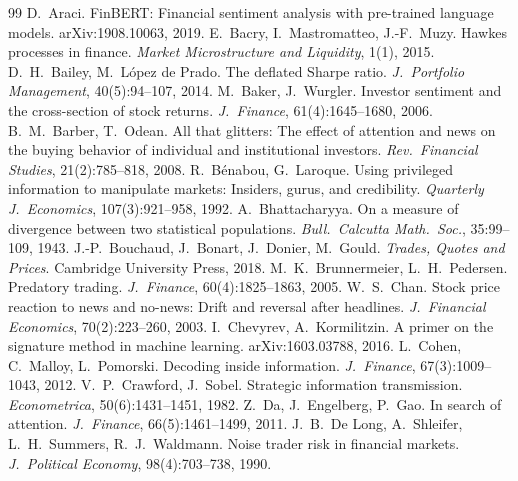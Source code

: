\documentclass[10pt,twocolumn,letterpaper]{article}
\theoremstyle{plain}
\theoremstyle{definition}
\theoremstyle{remark}
\begin{document}
{\small
\begin{thebibliography}{99}\setlength{\itemsep}{0pt}\footnotesize
{} D.~Araci. FinBERT: Financial sentiment analysis with pre-trained language models. arXiv:1908.10063, 2019.
 E.~Bacry, I.~Mastromatteo, J.-F.~Muzy. Hawkes processes in finance. \emph{Market Microstructure and Liquidity}, 1(1), 2015.
 D.~H.~Bailey, M.~L\'opez de Prado. The deflated Sharpe ratio. \emph{J.\ Portfolio Management}, 40(5):94--107, 2014.
 M.~Baker, J.~Wurgler. Investor sentiment and the cross-section of stock returns. \emph{J.\ Finance}, 61(4):1645--1680, 2006.
 B.~M.~Barber, T.~Odean. All that glitters: The effect of attention and news on the buying behavior of individual and institutional investors. \emph{Rev.\ Financial Studies}, 21(2):785--818, 2008.
 R.~B\'enabou, G.~Laroque. Using privileged information to manipulate markets: Insiders, gurus, and credibility. \emph{Quarterly J.\ Economics}, 107(3):921--958, 1992.
 A.~Bhattacharyya. On a measure of divergence between two statistical populations. \emph{Bull.\ Calcutta Math.\ Soc.}, 35:99--109, 1943.
 J.-P.~Bouchaud, J.~Bonart, J.~Donier, M.~Gould. \emph{Trades, Quotes and Prices}. Cambridge University Press, 2018.
 M.~K.~Brunnermeier, L.~H.~Pedersen. Predatory trading. \emph{J.\ Finance}, 60(4):1825--1863, 2005.
 W.~S.~Chan. Stock price reaction to news and no-news: Drift and reversal after headlines. \emph{J.\ Financial Economics}, 70(2):223--260, 2003.
 I.~Chevyrev, A.~Kormilitzin. A primer on the signature method in machine learning. arXiv:1603.03788, 2016.
 L.~Cohen, C.~Malloy, L.~Pomorski. Decoding inside information. \emph{J.\ Finance}, 67(3):1009--1043, 2012.
 V.~P.~Crawford, J.~Sobel. Strategic information transmission. \emph{Econometrica}, 50(6):1431--1451, 1982.
 Z.~Da, J.~Engelberg, P.~Gao. In search of attention. \emph{J.\ Finance}, 66(5):1461--1499, 2011.
 J.~B.~De Long, A.~Shleifer, L.~H.~Summers, R.~J.~Waldmann. Noise trader risk in financial markets. \emph{J.\ Political Economy}, 98(4):703--738, 1990.

\end{thebibliography}}
\end{document}
